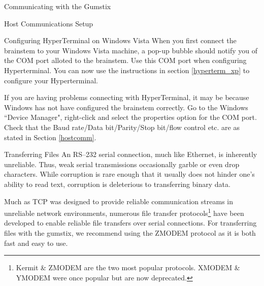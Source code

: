 \documentclass{article}
\begin{document}
\begin{section}{Communicating with the Gumstix}
\begin{subsection}{Host Communications Setup}
\begin{subsection}{Configuring HyperTerminal on Windows Vista}
				When you first connect the brainstem to your Windows Vista machine, a
				pop-up bubble should notify you of the COM port alloted to the brainstem.
				Use this COM port when configuring Hyperterminal.  You can now use the
				instructions in section \ref{hyperterm_xp} to configure your Hyperterminal.

				If you are having problems connecting with HyperTerminal, it may be
				because Windows has not have configured the brainstem correctly.  Go to the
				Windows ``Device Manager", right-click and select the properties option for the
				COM port.  Check that the Baud rate/Data bit/Parity/Stop bit/flow control etc.
				are as stated in Section \ref{hostcomm}.
			\end{subsection}
		\end{subsection}

		\begin{subsection}{Transferring Files} \label{files}
			An RS--232 serial connection, much like Ethernet, is inherently unreliable.
			Thus, weak serial transmissions occasionally garble or even drop
			characters.  While corruption is rare enough that it usually does not
			hinder one's ability to read text, corruption is deleterious to
			transferring binary data.

			Much as TCP was designed to provide reliable communication streams in
			unreliable network environments, numerous file transfer
			protocols\footnote{Kermit \& ZMODEM are the two most popular protocols.
			XMODEM \& YMODEM were once popular but are now deprecated.} have been
			developed to enable reliable file transfers over serial connections.  For
			transferring files with the gumstix, we recommend using the ZMODEM
			protocol as it is both fast and easy to use.


\end{subsection}
\end{section}
\end{document}
